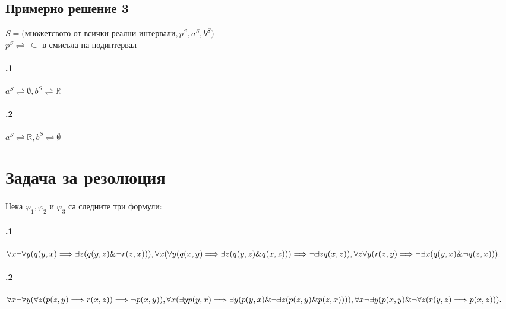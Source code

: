 \documentclass{article}
\begin{document}
\subsection{Примерно решение 3}
\begin{addmargin}[1em]{2em}
\begin{center}
$ S = ( $множетсвото от всички реални интервали$, p^S, a^S, b^S)$ \\
$ p^S \rightleftharpoons \ \subseteq $ в смисъла на подинтервал\\
\paragraph{\hspace{0.5em} .1} 
$a^S \rightleftharpoons \emptyset, b^S \rightleftharpoons \mathbb{R}$
\paragraph{\hspace{0.5em} .2} 
$a^S \rightleftharpoons \mathbb{R}, b^S \rightleftharpoons \emptyset$
\end{center}

\end{addmargin}
\newpage
\section{Задача за резолюция}
\paragraph{}
Нека $\varphi_1, \varphi_2$ и $\varphi_3$ са следните три формули: 
\paragraph{\hspace{0.5em} .1} 
\begin{addmargin}[1em]{2em}
$\forall x\neg \forall y (q(y, x) \Longrightarrow \exists z (q(y, z)\&\neg r(z, x))),\\
\forall x( \forall y ( q(x, y)\Longrightarrow \exists z(q(y,z)\&q(x, z))) \Longrightarrow \neg\exists z q(x,z)), \\
\forall z\forall y ( r(z, y) \Longrightarrow \neg\exists x(q(y,x)\&\neg q(z,x))).$
\end{addmargin}
\vskip 0.2in
\paragraph{\hspace{0.5em} .2} 
\begin{addmargin}[1em]{2em}
$\forall x\neg \forall y (\forall z(p(z, y) \Longrightarrow r(x, z))\Longrightarrow \neg p(x, y)),\\
\forall x( \exists y p(y,x) \Longrightarrow \exists y(p(y,x)\&\neg\exists z(p(z,y)\&p(z,x)))), \\
\forall x\neg\exists y (p(x,y)\&\neg\forall z(r(y,z) \Longrightarrow p(x, z))).$
\end{addmargin}
\end{document}
